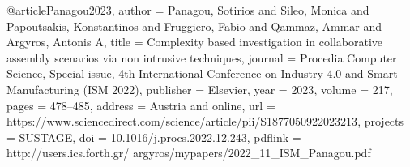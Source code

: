 @article{Panagou2023,
  author = {Panagou, Sotirios and Sileo, Monica and Papoutsakis, Konstantinos and Fruggiero, Fabio and Qammaz, Ammar and Argyros, Antonis A},
  title = {Complexity based investigation in collaborative assembly scenarios via non intrusive techniques},
  journal = {Procedia Computer Science, Special issue, 4th International Conference on Industry 4.0 and Smart Manufacturing (ISM 2022)},
  publisher = {Elsevier},
  year = {2023},
  volume = {217},
  pages = {478--485},
  address = {Austria and online},
  url = {https://www.sciencedirect.com/science/article/pii/S1877050922023213},
  projects =  {SUSTAGE},
  doi = {10.1016/j.procs.2022.12.243},
  pdflink = {http://users.ics.forth.gr/ argyros/mypapers/2022_11_ISM_Panagou.pdf}
}